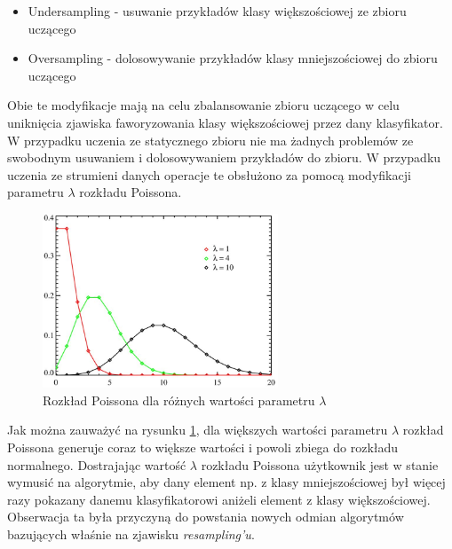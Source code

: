 \begin{itemize}
    \item Undersampling - usuwanie przykładów klasy większościowej ze zbioru uczącego
    \item Oversampling - dolosowywanie przykładów klasy mniejszościowej do zbioru uczącego
\end{itemize}

\noindent Obie te modyfikacje mają na celu zbalansowanie zbioru uczącego w celu uniknięcia zjawiska faworyzowania klasy większościowej przez dany klasyfikator. W przypadku uczenia ze statycznego zbioru nie ma żadnych problemów ze swobodnym usuwaniem i dolosowywaniem przykładów do zbioru. W przypadku uczenia ze strumieni danych operacje te obsłużono za pomocą modyfikacji parametru $\lambda$ rozkładu Poissona.

\begin{figure}[h] 
    \centering
    \includegraphics[width=7cm]{figures/poisson.JPG}
    \caption{Rozkład Poissona dla różnych wartości parametru $\lambda$}\label{Figure:Poisson}
\end{figure}

\noindent Jak można zauważyć na rysunku \ref{Figure:Poisson}, dla większych wartości parametru $\lambda$ rozkład Poissona generuje coraz to większe wartości i powoli zbiega do rozkładu normalnego. Dostrajając wartość $\lambda$ rozkładu Poissona użytkownik jest w stanie wymusić na algorytmie, aby dany element np. z klasy mniejszościowej był więcej razy pokazany danemu klasyfikatorowi aniżeli element z klasy większościowej. Obserwacja ta była przyczyną do powstania nowych odmian algorytmów bazujących właśnie na zjawisku \textit{resampling'u}.

